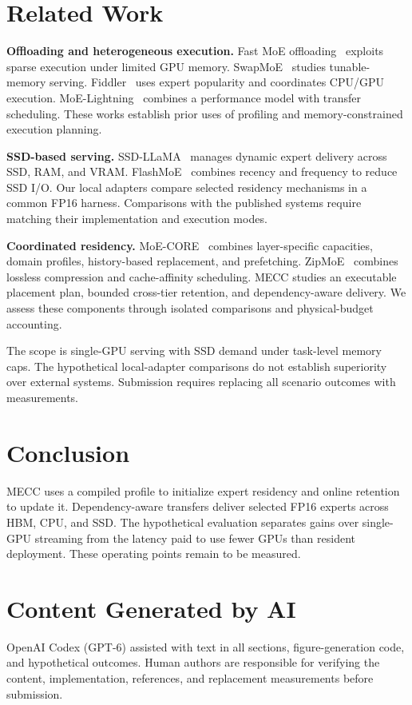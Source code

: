 \documentclass[conference,9pt,letterpaper]{IEEEtran}
\newcommand{\mecc}{\textsc{MECC}}
\begin{document}
\section{Related Work}
\textbf{Offloading and heterogeneous execution.} Fast MoE offloading~\cite{offloading} exploits sparse execution under limited GPU memory. SwapMoE~\cite{swapmoe} studies tunable-memory serving. Fiddler~\cite{fiddler} uses expert popularity and coordinates CPU/GPU execution. MoE-Lightning~\cite{lightning} combines a performance model with transfer scheduling. These works establish prior uses of profiling and memory-constrained execution planning.

\textbf{SSD-based serving.} SSD-LLaMA~\cite{ssdllama} manages dynamic expert delivery across SSD, RAM, and VRAM. FlashMoE~\cite{flashmoe} combines recency and frequency to reduce SSD I/O. Our local adapters compare selected residency mechanisms in a common FP16 harness. Comparisons with the published systems require matching their implementation and execution modes.

\textbf{Coordinated residency.} MoE-CORE~\cite{core} combines layer-specific capacities, domain profiles, history-based replacement, and prefetching. ZipMoE~\cite{zipmoe} combines lossless compression and cache-affinity scheduling. \mecc{} studies an executable placement plan, bounded cross-tier retention, and dependency-aware delivery. We assess these components through isolated comparisons and physical-budget accounting.

The scope is single-GPU serving with SSD demand under task-level memory caps. The hypothetical local-adapter comparisons do not establish superiority over external systems. Submission requires replacing all scenario outcomes with measurements.

\section{Conclusion}
\mecc{} uses a compiled profile to initialize expert residency and online retention to update it. Dependency-aware transfers deliver selected FP16 experts across HBM, CPU, and SSD. The hypothetical evaluation separates gains over single-GPU streaming from the latency paid to use fewer GPUs than resident deployment. These operating points remain to be measured.

\section*{Content Generated by AI}
OpenAI Codex (GPT-6) assisted with text in all sections, figure-generation code, and hypothetical outcomes. Human authors are responsible for verifying the content, implementation, references, and replacement measurements before submission.

\clearpage
{}


\end{document}
